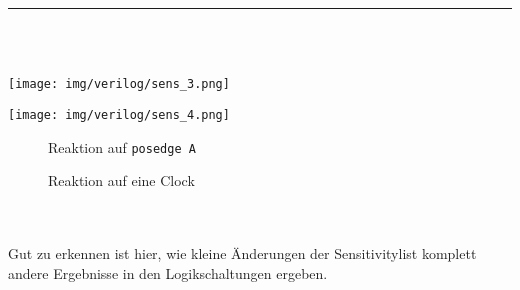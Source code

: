 \begin{minipage}[H]{\textwidth}
\begin{minipage}[H]{\textwidth}
\begin{minipage}[b]{0.5\textwidth}
		\end{minipage}	
	\end{minipage}
	\\\\
	\hrule
	~\\\\
	\begin{minipage}[H]{\textwidth}
		\begin{minipage}[b]{0.5\textwidth}
			\texttt{[image: img/verilog/sens\_3.png]}
		\end{minipage}
		\begin{minipage}[b]{0.5\textwidth}
			\texttt{[image: img/verilog/sens\_4.png]}
		\end{minipage}
	\end{minipage}
	\begin{minipage}[H]{\textwidth}
		\begin{minipage}[b]{0.5\textwidth}
			\centering
			\begin{minipage}[b]{0.9\textwidth}
				\begin{figure}[H]
					\lstset{style=verilog-style}
					
					\caption{Reaktion auf \texttt{posedge A}} \label{sens_3}
				\end{figure}
			\end{minipage}
		\end{minipage}	
		\begin{minipage}[b]{0.5\textwidth}
			\centering
			\begin{minipage}[b]{0.9\textwidth}
				\begin{figure}[H]
					\lstset{style=verilog-style}
					
					\caption{Reaktion auf eine Clock} \label{sens_4}
				\end{figure}
			\end{minipage}
		\end{minipage}	
	\end{minipage}
\end{minipage}
\\\\
Gut zu erkennen ist hier, wie kleine Änderungen der Sensitivitylist komplett andere Ergebnisse in den Logikschaltungen ergeben.\\
